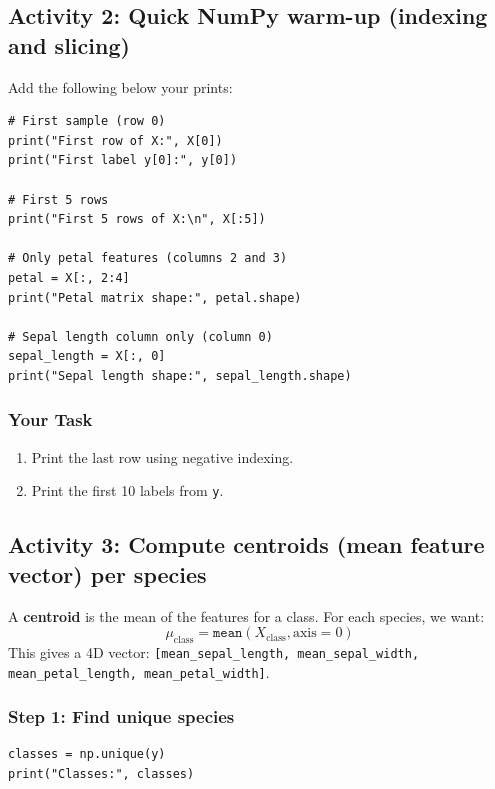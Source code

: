 \newpage
\subsection{Activity 2: Quick NumPy warm-up (indexing and slicing)}

\noindent
Add the following below your prints:

\begin{verbatim}
# First sample (row 0)
print("First row of X:", X[0])
print("First label y[0]:", y[0])

# First 5 rows
print("First 5 rows of X:\n", X[:5])

# Only petal features (columns 2 and 3)
petal = X[:, 2:4]
print("Petal matrix shape:", petal.shape)

# Sepal length column only (column 0)
sepal_length = X[:, 0]
print("Sepal length shape:", sepal_length.shape)
\end{verbatim}

\subsubsection{Your Task}
\begin{enumerate}
    \item Print the last row using negative indexing.
    \item Print the first 10 labels from \texttt{y}.
\end{enumerate}

\newpage
\subsection{Activity 3: Compute centroids (mean feature vector) per species}

\noindent
A \textbf{centroid} is the mean of the features for a class. For each species, we want:
\[
    \mu_{\text{class}} = \texttt{mean}(X_{\text{class}}, \text{axis}=0)
\]
This gives a 4D vector:
\texttt{[mean\_sepal\_length, mean\_sepal\_width, mean\_petal\_length, mean\_petal\_width]}.

\subsubsection{Step 1: Find unique species}
\begin{verbatim}
classes = np.unique(y)
print("Classes:", classes)
\end{verbatim}

